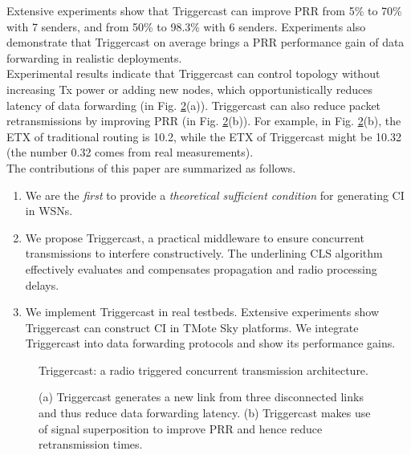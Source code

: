 \documentclass[conference]{IEEEtran}
\begin{document}
Extensive experiments show that Triggercast can improve PRR from 5\% to 70\% with 7 senders, and from 50\% to 98.3\% with 6 senders.
Experiments also demonstrate that Triggercast on average brings a  PRR performance gain of data forwarding in realistic deployments.\\
\indent Experimental results indicate that Triggercast can control topology without increasing Tx power or adding new nodes, which opportunistically reduces latency of data forwarding (in Fig. \ref{Fig_OpportunisticRouting}(a)).
Triggercast can also reduce packet retransmissions by improving PRR (in Fig. \ref{Fig_OpportunisticRouting}(b)).
For example, in Fig. \ref{Fig_OpportunisticRouting}(b), the ETX of traditional routing is 1{0.2},
while the ETX of Triggercast might be 1{0.32} (the number 0.32 comes from real measurements).\\
\indent The contributions of this paper are summarized as follows.
\begin{enumerate}
\setlength{\itemsep}{-0.245ex}
\item
We are the \emph{first} to provide a \emph{theoretical sufficient condition} for generating CI in WSNs.
\item
We propose Triggercast, a practical middleware to ensure concurrent transmissions to interfere constructively.
The underlining CLS algorithm effectively evaluates and compensates propagation and radio processing delays.
\item
We implement Triggercast in real testbeds. Extensive experiments show Triggercast can construct CI in TMote Sky platforms. We integrate Triggercast into data forwarding protocols and show its performance gains.
\end{enumerate}
\begin{figure}
\centering
\caption{Triggercast: a radio triggered concurrent transmission architecture.}
{\label{Fig_TriggerCastArchitecture}}
\end{figure}
\begin{figure}
\centering
\caption{(a) Triggercast generates a new link from three disconnected links and thus reduce data forwarding latency. (b) Triggercast makes use of signal superposition to improve PRR and hence reduce retransmission times.}
{\label{Fig_OpportunisticRouting}}
\end{figure}
\end{document}
